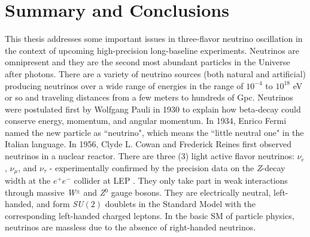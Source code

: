 \chapter{Summary and Conclusions}
\label{C7}
\par This thesis addresses some important issues in three-flavor neutrino oscillation in the context of upcoming high-precision long-baseline experiments. Neutrinos are omnipresent and they are the second most abundant particles in the Universe after photons. There are a variety of neutrino sources (both natural and artificial) producing neutrinos over a wide range of energies in the range of $10^{-4}$ to $10^{18}$ eV or so and traveling distances from a few meters to hundreds of Gpc. Neutrinos were postulated first by Wolfgang Pauli in 1930 to explain how beta-decay could conserve energy, momentum, and angular momentum. In 1934, Enrico Fermi named the new particle as ``neutrino", which means the ``little neutral one" in the Italian language. In 1956, Clyde L. Cowan and Frederick Reines first observed neutrinos in a nuclear reactor. There are three (3) light active flavor neutrinos: $\nu_e$, $\nu_\mu$, and $\nu_\tau$ - experimentally confirmed by the precision data on the \textit{Z}-decay width at the $e^+e^-$ collider at LEP \cite{ALEPH:2005ab}. They only take part in weak interactions through massive \textit{W}$^\pm$ and \textit{Z}$^0$ gauge bosons. They are electrically neutral, left-handed, and form \textit{SU}$(2)$ doublets in the Standard Model with the corresponding left-handed charged leptons. In the basic SM of particle physics, neutrinos are massless due to the absence of right-handed neutrinos. \\
